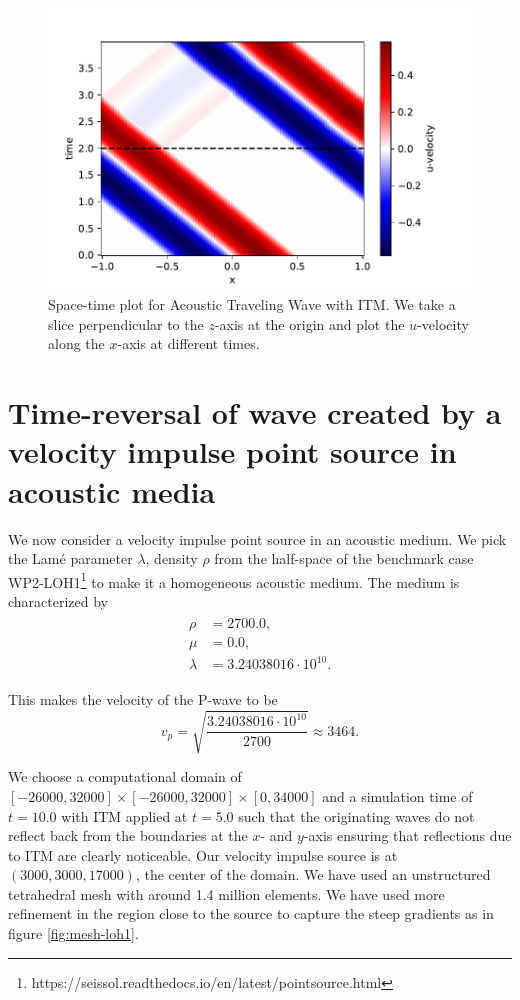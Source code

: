 \begin{figure}[htpb]
    \centering
    \includegraphics[width=0.75\linewidth]{figures/space-time-plot-travelling.pdf}
    \caption{Space-time plot for Acoustic Traveling Wave with \ac{ITM}. We take a slice perpendicular to the $z$-axis at the origin and plot the $u$-velocity along the $x$-axis at different times.}
    \label{fig:space-timeplot-travelling}
\end{figure}

\section{Time-reversal of wave created by a velocity impulse point source in acoustic media} \label{sec:acousticITM}

We now consider a velocity impulse point source in an acoustic medium. We pick the Lam\'{e} parameter $\lambda$, density $\rho$ 
from the half-space of the benchmark case WP2-LOH1\footnote[1]{https://seissol.readthedocs.io/en/latest/pointsource.html} to make it a homogeneous acoustic medium. 
The medium is characterized by
\begin{align}
    \begin{split}
        \rho &=    2700.0 ,\\
        \mu &=     0.0 ,\\
        \lambda &= 3.24038016 \cdot 10^{10} .
    \end{split}
\end{align}

This makes the velocity of the P-wave to be
\begin{equation}
    v_p = \sqrt{\frac{3.24038016 \cdot 10^{10}}{2700}} \approx 3464 .
\end{equation}

We choose a computational domain of $\left[-26000,32000\right] \times \left[-26000,32000\right] \times \left[0,34000\right]$ and a simulation time of $t=10.0$ with \ac{ITM} applied at $t=5.0$ 
such that the originating waves do not reflect back from the boundaries at the $x$- and $y$-axis ensuring that
reflections due to \ac{ITM} are clearly noticeable. Our velocity impulse source is at $\left(3000,3000,17000\right)$, the center of the domain. 
We have used an unstructured tetrahedral mesh with around 1.4 million elements. We have used more refinement in the region close to the source to capture the steep gradients as in figure \ref{fig:mesh-loh1}.

